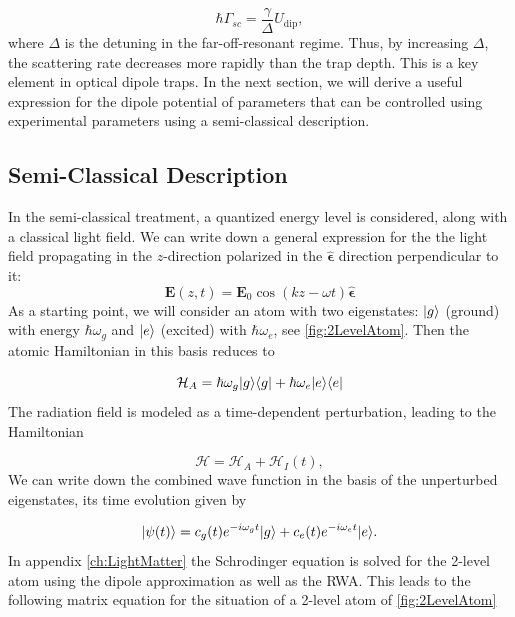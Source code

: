 \begin{equation}\label{eq:RelationUG}
    \hbar \Gamma_{sc} =\frac{\gamma}{\Delta} U_{\text{dip}},
\end{equation}
where $\Delta$ is the detuning in the far-off-resonant regime. 
Thus, by increasing $\Delta$, the scattering rate decreases more rapidly than the trap depth. 
This is a key element in optical dipole traps. 
In the next section, we will derive a useful expression for the dipole potential of parameters that can be controlled using experimental parameters using a semi-classical description.

\subsection{Semi-Classical Description}

In the semi-classical treatment, a quantized energy level is considered, along with a classical light field. 
We can write down a general expression for the the light field propagating in the $z$-direction polarized in the $\bm{\hat{\epsilon}}$ direction perpendicular to it:
\begin{equation}\label{eq:ClassicalField}
	\mathbf{E}(z,t) = \mathbf{E}_0 \cos{(k z - \omega t)} 	\bm{\hat{\epsilon}}
\end{equation}
As a starting point, we will consider an atom with two eigenstates: $\lvert g\rangle$ (ground) with energy $\hbar \omega_g$ and $\lvert e\rangle$ (excited) with $\hbar \omega_e$, see \cref{fig:2LevelAtom}. 
Then the atomic Hamiltonian in this basis reduces to \cite{Loudon2000}


\begin{equation}\label{eq:AtomHamiltonianMain}
	\mathcal{H}_A = \hbar \omega_g \lvert g\rangle\langle g\rvert + \hbar \omega_e \lvert e\rangle\langle e\rvert
\end{equation}
The radiation field is modeled as a time-dependent perturbation, leading to the Hamiltonian \cite{Leeuwen2017}

\begin{equation}\label{eq:PerturbationMain}
	\mathcal{H} = \mathcal{H}_A + \mathcal{H}_{I}(t),
\end{equation}
We can write down the combined wave function in the basis of the unperturbed eigenstates, its time evolution given by

\begin{equation}\label{eq:TwoLevelMain}
	\lvert\psi(t)\rangle = c_g(t) e^{-i \omega_g t} \lvert g\rangle + c_e(t) e^{-i \omega_e t} \lvert e\rangle.
\end{equation}
In appendix \ref{ch:LightMatter} the Schrodinger equation is solved for the 2-level atom using the dipole approximation as well as the \acf*{RWA}. 
This leads to the following matrix equation for the situation of a 2-level atom of \cref{fig:2LevelAtom} \cite{Foot2005}

